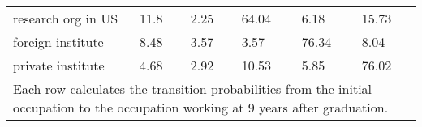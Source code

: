 \begin{table}[htbp]
\begin{adjustbox}{max width=1\textwidth}
\begin{tabular}{llllll}
			research org in US        & 11.8  & 2.25  & {\color{blue}64.04} & 6.18  & 15.73 \\
			foreign institute       & 8.48  & 3.57  & 3.57  & {\color{blue}76.34} & 8.04  \\
			private institute       & 4.68  & 2.92  & 10.53 & 5.85  & {\color{blue}76.02} \\ \hline\hline
			\multicolumn{6}{l}{\footnotesize Each row calculates the transition probabilities from the initial occupation to the occupation working at 9 years after graduation. }
		\end{tabular}%
	\end{adjustbox}
\end{table}